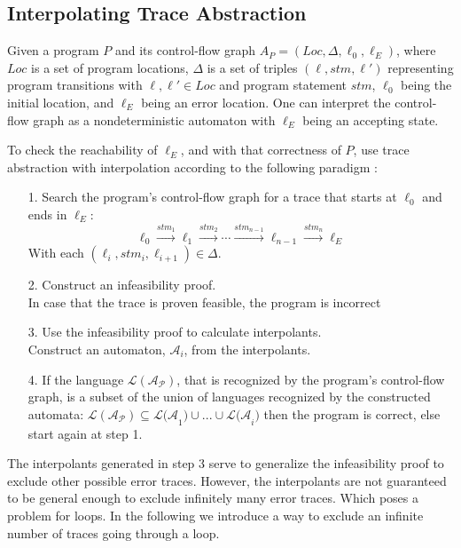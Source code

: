 \documentclass{article}
\begin{document}
\subsection{Interpolating Trace Abstraction}
Given a program $P$ and its control-flow graph $A_P = (Loc, \Delta, \ell_{0}, \ell_E)$, where $Loc$ is a set of program locations, $\Delta$ is a set of triples $(\ell, stm, \ell')$ representing program transitions with $\ell, \ell' \in Loc$ and program statement $stm$, $\ell_{0}$ being the initial location, and $\ell_E$ being an error location. One can interpret the control-flow graph as a nondeterministic automaton with $\ell_E$ being an accepting state. \par To check the reachability of $\ell_E$, and with that correctness of $P$, use trace abstraction with interpolation according to the following paradigm \cite{10.1007/978-3-642-03237-0_7}:
\begin{itemize}
	\item[1.] Search the program's control-flow graph for a trace that starts at $\ell_0$ and ends in $\ell_E$:
	\begin{equation*}
			 \ell_{0} \xrightarrow{\text{$stm_1$}} \ell_1 \xrightarrow{\text{$stm_2$}} \cdots \xrightarrow{\text{$stm_{n-1}$}} \ell_{n-1} \xrightarrow{\text{$stm_{n}$}} \ell_{E}
	\end{equation*}
	With each $(\ell_i, stm_i, \ell_{i + 1}) \in \Delta$.
	\item[2.] Construct an infeasibility proof. \\ In case that the trace is proven feasible, the program is incorrect
	\item[3.] Use the infeasibility proof to calculate interpolants. \\
	Construct an automaton, $\mathcal{A}_i$, from the interpolants.
	\item[4.] If the language $\mathcal{L(A_P)}$, that is recognized by the program's control-flow graph, is a subset of the union of languages recognized by the constructed automata: $\mathcal{L(A_P)} \subseteq \mathcal{L(A}_1) \cup ... \cup \mathcal{L(A}_i)$ then the program is correct, else start again at step 1.
\end{itemize}
The interpolants generated in step 3 serve to generalize the infeasibility proof to exclude other possible error traces. However, the interpolants are not guaranteed to be general enough to exclude infinitely many error traces. Which poses a problem for loops. In the following we introduce a way to exclude an infinite number of traces going through a loop.
\end{document}
